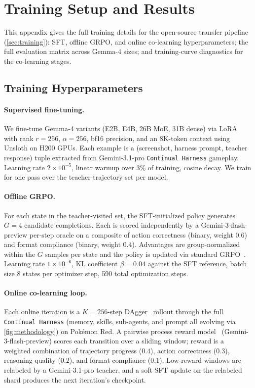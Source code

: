 \section{Training Setup and Results}\label{app:training}

This appendix gives the full training details for the open-source transfer pipeline (\cref{sec:training}): SFT, offline GRPO, and online co-learning hyperparameters; the full evaluation matrix across Gemma-4 sizes; and training-curve diagnostics for the co-learning stages.

\subsection{Training Hyperparameters}\label{app:training:hyperparams}

\paragraph{Supervised fine-tuning.} We fine-tune Gemma-4 variants (E2B, E4B, 26B MoE, 31B dense) via LoRA with rank $r{=}256$, $\alpha{=}256$, bf16 precision, and an 8K-token context using Unsloth on H200 GPUs. Each example is a (screenshot, harness prompt, teacher response) tuple extracted from Gemini-3.1-pro \texttt{Continual Harness} gameplay. Learning rate $2\times10^{-5}$, linear warmup over 3\% of training, cosine decay. We train for one pass over the teacher-trajectory set per model.

\paragraph{Offline GRPO.} For each state in the teacher-visited set, the SFT-initialized policy generates $G{=}4$ candidate completions. Each is scored independently by a Gemini-3-flash-preview per-step oracle on a composite of action correctness (binary, weight $0.6$) and format compliance (binary, weight $0.4$). Advantages are group-normalized within the $G$ samples per state and the policy is updated via standard GRPO~\citep{shao2024deepseekmath}. Learning rate $1\times10^{-6}$, KL coefficient $\beta{=}0.04$ against the SFT reference, batch size 8 states per optimizer step, 590 total optimization steps.

\paragraph{Online co-learning loop.} Each online iteration is a $K{=}256$-step DAgger~\citep{ross2011reduction,karten2026smallexperts} rollout through the full \texttt{Continual Harness} (memory, skills, sub-agents, and prompt all evolving via \cref{fig:methodology}) on Pok\'emon Red. A pairwise process reward model~\citep{wang2026openclawrl} (Gemini-3-flash-preview) scores each transition over a sliding window; reward is a weighted combination of trajectory progress ($0.4$), action correctness ($0.3$), reasoning quality ($0.2$), and format compliance ($0.1$). Low-reward windows are relabeled by a Gemini-3.1-pro teacher, and a soft SFT update on the relabeled shard produces the next iteration's checkpoint.


